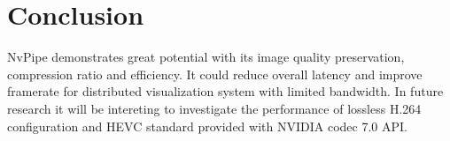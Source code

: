 \documentclass{vgtc}                          %
\begin{document}
\section{Conclusion}


NvPipe demonstrates great potential with its image quality preservation, compression ratio and efficiency. It could reduce overall latency and improve framerate for distributed visualization system with limited bandwidth. In future research it will be intereting to investigate the performance of lossless H.264 configuration and HEVC standard provided with NVIDIA codec 7.0 API.


\pagebreak


\nocite{*}

\end{document}
